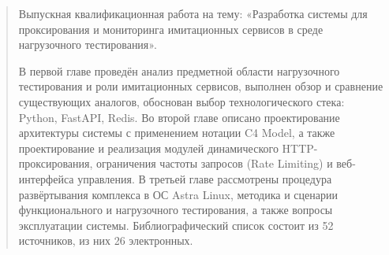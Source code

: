 \begin{abstract}
\thispagestyle{empty}
Выпускная квалификационная работа на тему: «Разработка системы для проксирования и мониторинга имитационных сервисов в среде нагрузочного тестирования».

В первой главе проведён анализ предметной области нагрузочного тестирования и роли имитационных сервисов, выполнен обзор и сравнение существующих аналогов, обоснован выбор технологического стека: Python, FastAPI, Redis. Во второй главе описано проектирование архитектуры системы с применением нотации C4 Model, а также проектирование и реализация модулей динамического HTTP-проксирования, ограничения частоты запросов (Rate Limiting) и веб-интерфейса управления. В третьей главе рассмотрены процедура развёртывания комплекса в ОС Astra Linux, методика и сценарии функционального и нагрузочного тестирования, а также вопросы эксплуатации системы. Библиографический список состоит из 52 источников, из них 26 электронных.
\end{abstract}